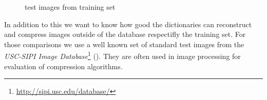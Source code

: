 \begin{figure}[h]
\hspace{5mm}
\caption{test images from training set}
\label{fig:database_images}
\end{figure}
In addition to this we want to know how good the dictionaries can reconstruct
and compress images outside of the database respectifly the training set. For
those comparisons we use a well known set of standard test images from the
\emph{USC-SIPI Image
Database}\footnote{\url{http://sipi.usc.edu/database/}}
(). They are often used in image processing for
evaluation of compression algorithms. 

